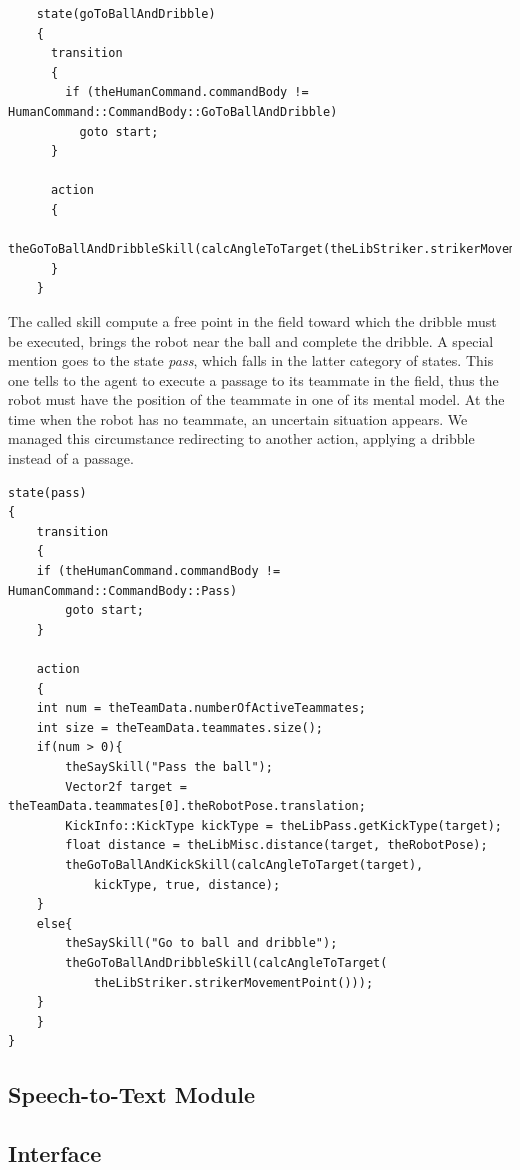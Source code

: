 \documentclass[a4paper, onecolumn, 12pt]{article}
\begin{document}
\begin{verbatim}
    state(goToBallAndDribble)
    {
      transition
      {
        if (theHumanCommand.commandBody != HumanCommand::CommandBody::GoToBallAndDribble)
          goto start;
      }

      action
      {
        theGoToBallAndDribbleSkill(calcAngleToTarget(theLibStriker.strikerMovementPoint()));
      }
    }
\end{verbatim}
The called skill compute a free point in the field toward which the dribble must be executed,  
brings the robot near the ball and complete the dribble.
A special mention goes to the state \textit{pass}, which falls in the latter category of states.
This one tells to the agent to execute a passage to its teammate in the field, thus the robot
must have the position of the teammate in one of its mental model. 
At the time when the robot has no teammate, an uncertain situation appears.
We managed this circumstance redirecting to another action, applying a dribble instead of a passage.

\begin{verbatim}
state(pass)
{
    transition
    {
    if (theHumanCommand.commandBody != HumanCommand::CommandBody::Pass)
        goto start;
    }

    action
    {
    int num = theTeamData.numberOfActiveTeammates;
    int size = theTeamData.teammates.size();
    if(num > 0){
        theSaySkill("Pass the ball");
        Vector2f target = theTeamData.teammates[0].theRobotPose.translation;
        KickInfo::KickType kickType = theLibPass.getKickType(target);
        float distance = theLibMisc.distance(target, theRobotPose);
        theGoToBallAndKickSkill(calcAngleToTarget(target), 
            kickType, true, distance);
    }
    else{
        theSaySkill("Go to ball and dribble");
        theGoToBallAndDribbleSkill(calcAngleToTarget(
            theLibStriker.strikerMovementPoint()));
    }
    }
}
\end{verbatim}




\subsection{Speech-to-Text Module}


\subsection{Interface}
\end{document}
